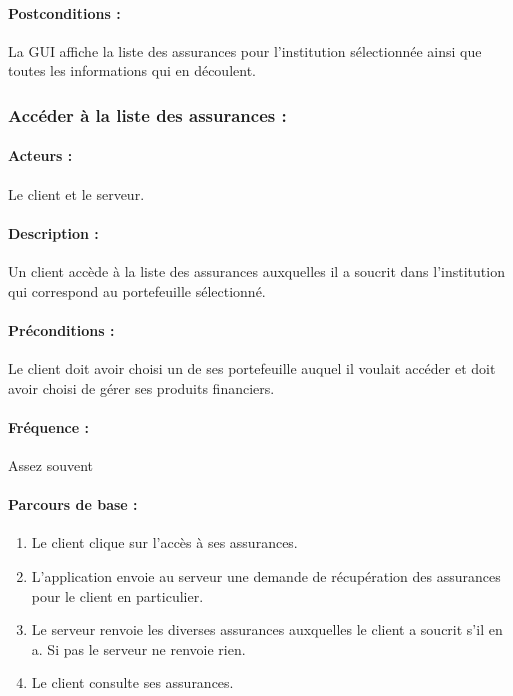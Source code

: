 \documentclass[../annexe.tex]{subfiles}
\begin{document}
\paragraph{Postconditions :} La GUI affiche la liste des assurances pour l'institution sélectionnée ainsi que toutes les informations qui en découlent.

\newpage

\subsubsection{Accéder à la liste des assurances :}

\paragraph{Acteurs :} Le client et le serveur.

\paragraph{Description :} Un client accède à la liste des assurances auxquelles il a soucrit dans l'institution qui correspond au portefeuille sélectionné.

\paragraph{Préconditions :} Le client doit avoir choisi un de ses portefeuille auquel il voulait accéder et doit avoir choisi de gérer ses produits financiers.

\paragraph{Fréquence :} Assez souvent

\paragraph{Parcours de base :} 

	\begin{enumerate}
		\item Le client clique sur l'accès à ses assurances.
		\item L'application envoie au serveur une demande de récupération des assurances pour le client en particulier.
		\item Le serveur renvoie les diverses assurances auxquelles le client a soucrit s'il en a. 
		Si pas le serveur ne renvoie rien.
		\item Le client consulte ses assurances.
	\end{enumerate}
\end{document}
